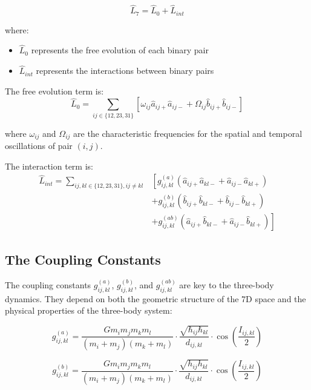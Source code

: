 \documentclass{article}
\begin{document}
\begin{equation}
\hat{L}_7 = \hat{L}_0 + \hat{L}_{int}
\end{equation}

where:
\begin{itemize}
\item $\hat{L}_0$ represents the free evolution of each binary pair
\item $\hat{L}_{int}$ represents the interactions between binary pairs
\end{itemize}

The free evolution term is:
\begin{equation}
\hat{L}_0 = \sum_{ij \in \{12,23,31\}} \left[ \omega_{ij} \hat{a}_{ij+}\hat{a}_{ij-} + \Omega_{ij} \hat{b}_{ij+}\hat{b}_{ij-} \right]
\end{equation}

where $\omega_{ij}$ and $\Omega_{ij}$ are the characteristic frequencies for the spatial and temporal oscillations of pair $(i,j)$.

The interaction term is:
\begin{align}
\hat{L}_{int} = \sum_{ij,kl \in \{12,23,31\}, ij \neq kl} &\left[ g_{ij,kl}^{(a)} (\hat{a}_{ij+}\hat{a}_{kl-} + \hat{a}_{ij-}\hat{a}_{kl+}) \right.\\
&+ \left. g_{ij,kl}^{(b)} (\hat{b}_{ij+}\hat{b}_{kl-} + \hat{b}_{ij-}\hat{b}_{kl+}) \right.\\
&+ \left. g_{ij,kl}^{(ab)} (\hat{a}_{ij+}\hat{b}_{kl-} + \hat{a}_{ij-}\hat{b}_{kl+}) \right]
\end{align}

\subsection{The Coupling Constants}

The coupling constants $g_{ij,kl}^{(a)}$, $g_{ij,kl}^{(b)}$, and $g_{ij,kl}^{(ab)}$ are key to the three-body dynamics. They depend on both the geometric structure of the 7D space and the physical properties of the three-body system:

\begin{equation}
g_{ij,kl}^{(a)} = \frac{G m_i m_j m_k m_l}{(m_i+m_j)(m_k+m_l)} \cdot \frac{\sqrt{\hbar_{ij}\hbar_{kl}}}{d_{ij,kl}} \cdot \cos\left(\frac{I_{ij,kl}}{2}\right)
\end{equation}

\begin{equation}
g_{ij,kl}^{(b)} = \frac{G m_i m_j m_k m_l}{(m_i+m_j)(m_k+m_l)} \cdot \frac{\sqrt{h_{ij}h_{kl}}}{d_{ij,kl}} \cdot \cos\left(\frac{I_{ij,kl}}{2}\right)
\end{equation}
\end{document}

